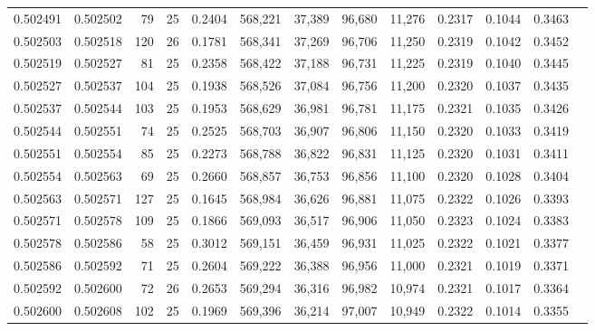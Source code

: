 \begin{tabular}{rrrrrrrrrrrrr}
0.502491 & 0.502502 &  79 &  25 &                                     0.2404 & 568,221 &  37,389 &  96,680 &  11,276 & 0.2317 & 0.1044 & 0.3463 \\
0.502503 & 0.502518 & 120 &  26 &                                     0.1781 & 568,341 &  37,269 &  96,706 &  11,250 & 0.2319 & 0.1042 & 0.3452 \\
0.502519 & 0.502527 &  81 &  25 &                                     0.2358 & 568,422 &  37,188 &  96,731 &  11,225 & 0.2319 & 0.1040 & 0.3445 \\
0.502527 & 0.502537 & 104 &  25 &                                     0.1938 & 568,526 &  37,084 &  96,756 &  11,200 & 0.2320 & 0.1037 & 0.3435 \\
0.502537 & 0.502544 & 103 &  25 &                                     0.1953 & 568,629 &  36,981 &  96,781 &  11,175 & 0.2321 & 0.1035 & 0.3426 \\
0.502544 & 0.502551 &  74 &  25 &                                     0.2525 & 568,703 &  36,907 &  96,806 &  11,150 & 0.2320 & 0.1033 & 0.3419 \\
0.502551 & 0.502554 &  85 &  25 &                                     0.2273 & 568,788 &  36,822 &  96,831 &  11,125 & 0.2320 & 0.1031 & 0.3411 \\
0.502554 & 0.502563 &  69 &  25 &                                     0.2660 & 568,857 &  36,753 &  96,856 &  11,100 & 0.2320 & 0.1028 & 0.3404 \\
0.502563 & 0.502571 & 127 &  25 &                                     0.1645 & 568,984 &  36,626 &  96,881 &  11,075 & 0.2322 & 0.1026 & 0.3393 \\
0.502571 & 0.502578 & 109 &  25 &                                     0.1866 & 569,093 &  36,517 &  96,906 &  11,050 & 0.2323 & 0.1024 & 0.3383 \\
0.502578 & 0.502586 &  58 &  25 &                                     0.3012 & 569,151 &  36,459 &  96,931 &  11,025 & 0.2322 & 0.1021 & 0.3377 \\
0.502586 & 0.502592 &  71 &  25 &                                     0.2604 & 569,222 &  36,388 &  96,956 &  11,000 & 0.2321 & 0.1019 & 0.3371 \\
0.502592 & 0.502600 &  72 &  26 &                                     0.2653 & 569,294 &  36,316 &  96,982 &  10,974 & 0.2321 & 0.1017 & 0.3364 \\
0.502600 & 0.502608 & 102 &  25 &                                     0.1969 & 569,396 &  36,214 &  97,007 &  10,949 & 0.2322 & 0.1014 & 0.3355 \\

\end{tabular}
